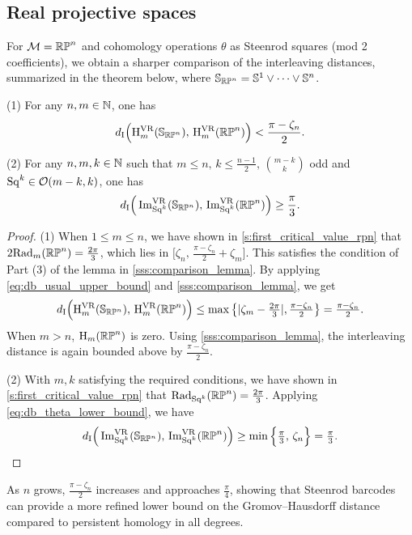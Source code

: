 \subsection{Real projective spaces}\label{ss:distance_estimate_rpn}

For \(\mathcal{M} = \mathbb{RP}^n\) and cohomology operations \(\theta\) as Steenrod squares (mod 2 coefficients), we obtain a sharper comparison of the interleaving distances, summarized in the theorem below, where \(\mathbb{S}_{\mathbb{RP}^n} = \mathbb{S}^1 \vee \dots \vee \mathbb{S}^n\).

\medskip\theorem
(1) For any \(n,m \in \mathbb{N}\), one has
\[
d_{\mathrm{I}}\Big(\mathrm{H}^{\mathrm{VR}}_m(\mathbb{S}_{\mathbb{RP}^n}),\, \mathrm{H}^{\mathrm{VR}}_m(\mathbb{RP}^n)\Big) < \frac{\pi-\zeta_n}{2}.
\]

(2) For any \(n,m,k \in \mathbb{N}\) such that $m \leq n,\, k \leq \tfrac{n-1}{2},\, \binom{m-k}{k}$ odd and $\mathrm{Sq}^k\in \mathcal{O}(m-k, k)$, one has
\[
d_{\mathrm{I}}\Big(\operatorname{Im}_{\mathrm{Sq}^k}^{\mathrm{VR}}(\mathbb{S}_{\mathbb{RP}^n}),\, \operatorname{Im}_{\mathrm{Sq}^k}^{\mathrm{VR}}(\mathbb{RP}^n)\Big) \geq \frac{\pi}{3}.
\]

\begin{proof}
    (1) %
    When $1 \leq m \leq n$, we have shown in \cref{s:first_critical_value_rpn} that
    $2\mathrm{Rad}_{m}(\mathbb{RP}^n) = \tfrac{2\pi}{3}$, which lies in $\big[\zeta_n,\, \tfrac{\pi - \zeta_n}{2}+\zeta_m\big]$.
    This satisfies the condition of Part (3) of the lemma in \cref{sss:comparison_lemma}.
	By applying \cref{eq:db_usual_upper_bound} and \cref{sss:comparison_lemma}, we get
	\[d_{\mathrm{I}}\Big(\mathrm{H}^{\mathrm{VR}}_m(\mathbb{S}_{\mathbb{RP}^n}),\, \mathrm{H}^{\mathrm{VR}}_m(\mathbb{RP}^n)\Big)
    \leq
    \max \big\{ |\zeta_m  - \tfrac{2\pi}{3} |, \tfrac{\pi - \zeta_n}{2} \big\}
    = \tfrac{\pi - \zeta_n}{2}.\]
    When $m > n$, $\mathrm{H}_m(\mathbb{RP}^n)$ is zero.
    Using \cref{sss:comparison_lemma}, the interleaving distance is again bounded above by $\tfrac{\pi - \zeta_n}{2}$.

    (2) With $m,k$ satisfying the required conditions, we have shown in \cref{s:first_critical_value_rpn} that
	$\mathrm{Rad}_{\mathrm{Sq}^k}(\mathbb{RP}^n) = \tfrac{2\pi}{3}$.
    Applying \cref{eq:db_theta_lower_bound}, we have
	\[d_{\mathrm{I}}\Big(\operatorname{Im}_{\mathrm{Sq}^k}^{\mathrm{VR}}(\mathbb{S}_{\mathbb{RP}^n}),\, \operatorname{Im}_{\mathrm{Sq}^k}^{\mathrm{VR}}(\mathbb{RP}^n)\Big)
	\geq \min\Big\{\tfrac{\pi}{3},\, \zeta_n\Big\}
	= \tfrac{\pi}{3}.\qedhere
    \]
\end{proof}

As \(n\) grows, \(\tfrac{\pi - \zeta_n}{2}\) increases and approaches \(\tfrac{\pi}{4}\), showing that Steenrod barcodes can provide a more refined lower bound on the Gromov--Hausdorff distance compared to persistent homology in all degrees.